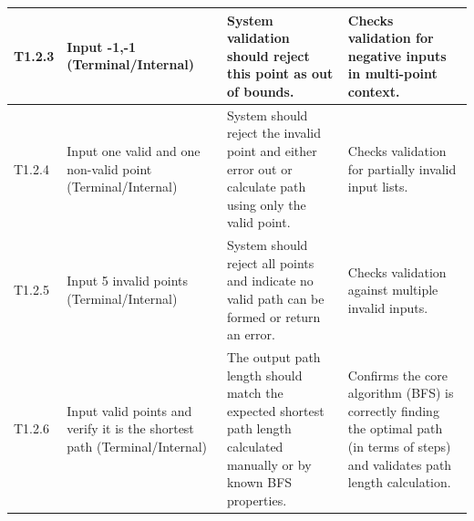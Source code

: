 \begin{longtable}{|p{}|p{}|p{}|p{}|}
	\hline
	T1.2.3 & Input -1,-1 (Terminal/Internal) & System validation should reject this point as out of bounds. & Checks validation for negative inputs in multi-point context. \\
	\hline
	T1.2.4 & Input one valid and one non-valid point (Terminal/Internal) & System should reject the invalid point and either error out or calculate path using only the valid point. & Checks validation for partially invalid input lists. \\
	\hline
	T1.2.5 & Input 5 invalid points (Terminal/Internal) & System should reject all points and indicate no valid path can be formed or return an error. & Checks validation against multiple invalid inputs. \\
	\hline
	T1.2.6 & Input valid points and verify it is the shortest path (Terminal/Internal) & The output path length should match the expected shortest path length calculated manually or by known BFS properties. & Confirms the core algorithm (BFS) is correctly finding the optimal path (in terms of steps) and validates path length calculation. \\
	\hline
\end{longtable}

